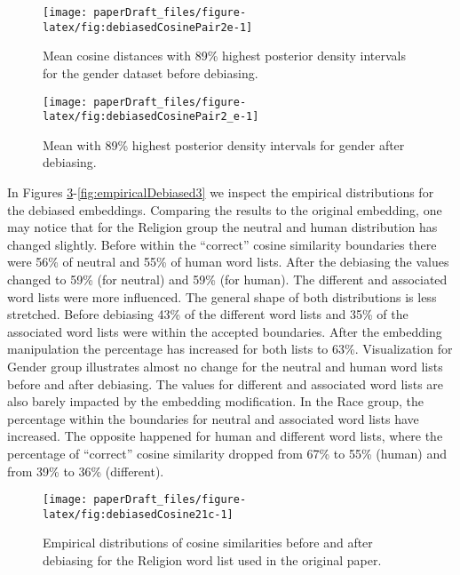 \documentclass[
  12pt,
  dvipsnames,enabledeprecatedfontcommands]{scrartcl}
\begin{document}
\begin{figure}[H]

\begin{center}\texttt{[image: paperDraft\_files/figure-latex/fig:debiasedCosinePair2e-1]} \end{center}
\caption{Mean cosine distances with 89\% highest posterior density intervals for the  gender dataset before debiasing.}
\label{fig:empiricalPriorToDebiasing}
\end{figure}

\begin{figure}[H]

\begin{center}\texttt{[image: paperDraft\_files/figure-latex/fig:debiasedCosinePair2\_e-1]} \end{center}
\caption{Mean with 89\% highest posterior density intervals for gender after debiasing.}
\label{fig:empiricalDebiased}
\end{figure}

In Figures \ref{fig:empiricalDebiased}-\ref{fig:empiricalDebiased3} we
inspect the empirical distributions for the debiased embeddings.
Comparing the results to the original embedding, one may notice that for
the Religion group the neutral and human distribution has changed
slightly. Before within the ``correct'' cosine similarity boundaries
there were 56\% of neutral and 55\% of human word lists. After the
debiasing the values changed to 59\% (for neutral) and 59\% (for human).
The different and associated word lists were more influenced. The
general shape of both distributions is less stretched. Before debiasing
43\% of the different word lists and 35\% of the associated word lists
were within the accepted boundaries. After the embedding manipulation
the percentage has increased for both lists to 63\%. Visualization for
Gender group illustrates almost no change for the neutral and human word
lists before and after debiasing. The values for different and
associated word lists are also barely impacted by the embedding
modification. In the Race group, the percentage within the boundaries
for neutral and associated word lists have increased. The opposite
happened for human and different word lists, where the percentage of
``correct'' cosine similarity dropped from 67\% to 55\% (human) and from
39\% to 36\% (different).

\begin{figure}[H]

\begin{center}\texttt{[image: paperDraft\_files/figure-latex/fig:debiasedCosine21c-1]} \end{center}
\caption{Empirical distributions of cosine similarities before and after  debiasing  for  the Religion word list  used in  the original paper.}
\label{fig:empiricalDebiased}
\end{figure}
\end{document}
